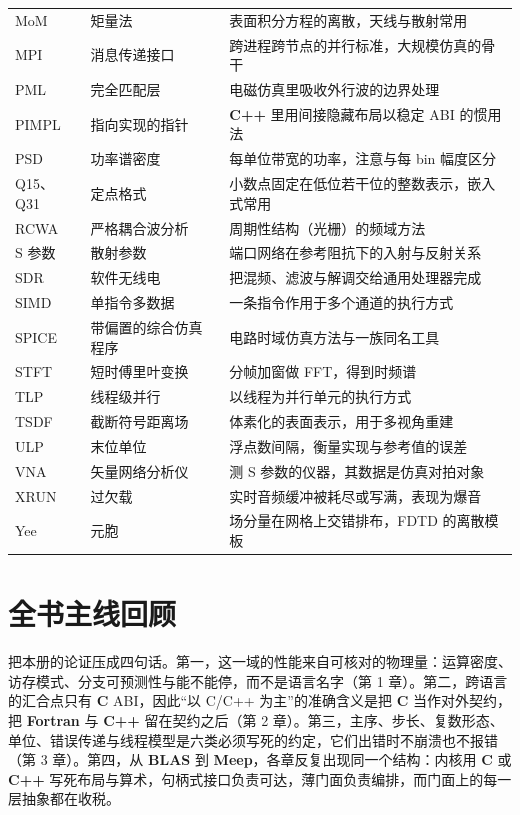 \documentclass[12pt,a4paper,fontset=fandol]{ctexbook}
\newcommand{\Lib}[1]{\textbf{#1}}
\newcommand{\Lang}[1]{\textsf{\bfseries #1}}
\newcommand{\CL}{\Lang{C}}
\newcommand{\CPP}{\Lang{C++}}
\newcommand{\FTN}{\Lang{Fortran}}
\begin{document}
\begin{longtable}{@{}>{\raggedright\arraybackslash}p{}
  >{\raggedright\arraybackslash}p{}
  >{\raggedright\arraybackslash}p{}@{}}
MoM & 矩量法 &
  表面积分方程的离散，天线与散射常用 \\
MPI & 消息传递接口 &
  跨进程跨节点的并行标准，大规模仿真的骨干 \\
PML & 完全匹配层 &
  电磁仿真里吸收外行波的边界处理 \\
PIMPL & 指向实现的指针 &
  \CPP{} 里用间接隐藏布局以稳定 ABI 的惯用法 \\
PSD & 功率谱密度 &
  每单位带宽的功率，注意与每 bin 幅度区分 \\
Q15、Q31 & 定点格式 &
  小数点固定在低位若干位的整数表示，嵌入式常用 \\
RCWA & 严格耦合波分析 &
  周期性结构（光栅）的频域方法 \\
S 参数 & 散射参数 &
  端口网络在参考阻抗下的入射与反射关系 \\
SDR & 软件无线电 &
  把混频、滤波与解调交给通用处理器完成 \\
SIMD & 单指令多数据 &
  一条指令作用于多个通道的执行方式 \\
SPICE & 带偏置的综合仿真程序 &
  电路时域仿真方法与一族同名工具 \\
STFT & 短时傅里叶变换 &
  分帧加窗做 FFT，得到时频谱 \\
TLP & 线程级并行 &
  以线程为并行单元的执行方式 \\
TSDF & 截断符号距离场 &
  体素化的表面表示，用于多视角重建 \\
ULP & 末位单位 &
  浮点数间隔，衡量实现与参考值的误差 \\
VNA & 矢量网络分析仪 &
  测 S 参数的仪器，其数据是仿真对拍对象 \\
XRUN & 过欠载 &
  实时音频缓冲被耗尽或写满，表现为爆音 \\
Yee & 元胞 &
  场分量在网格上交错排布，FDTD 的离散模板 \\
\end{longtable}

\section{全书主线回顾}

把本册的论证压成四句话。第一，这一域的性能来自可核对的物理量：运算密度、访存模式、分支可预测性与能不能停，而不是语言名字（第 1 章）。第二，跨语言的汇合点只有 \CL{} ABI，因此``以 C/C++ 为主''的准确含义是把 \CL{} 当作对外契约，把 \FTN{} 与 \CPP{} 留在契约之后（第 2 章）。第三，主序、步长、复数形态、单位、错误传递与线程模型是六类必须写死的约定，它们出错时不崩溃也不报错（第 3 章）。第四，从 \Lib{BLAS} 到 \Lib{Meep}，各章反复出现同一个结构：内核用 \CL{} 或 \CPP{} 写死布局与算术，句柄式接口负责可达，薄门面负责编排，而门面上的每一层抽象都在收税。
\end{document}
